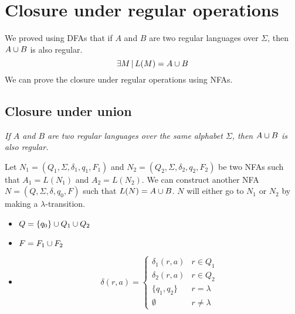 \documentclass{article}
\newcommand{\emptyString}{\lambda}
\begin{document}
\section{Closure under regular operations}

We proved using DFAs that if \(A\) and \(B\) are two regular languages over \(\Sigma\), then \(A\cup B\)
is also regular.
\[
    \exists M \,|\, L(M) = A \cup B
\]
We can prove the closure under regular operations using NFAs.

\subsection{Closure under union}

\textit{If \(A\) and \(B\) are two regular languages over the same alphabet
\(\Sigma\), then \(A \cup B\) is also regular.}

Let \(N_1 = (Q_1, \Sigma, \delta_1, q_1, F_1)\) and
\(N_2 = (Q_2, \Sigma, \delta_2, q_2, F_2)\) be two NFAs such that
\(A_1 = L(N_1)\) and \(A_2 = L(N_2)\).
We can construct another NFA \(N=(Q, \Sigma, \delta, q_0, F)\)
such that \(L(N)=A\cup B\).
\(N\) will either go to \(N_1\) or \(N_2\) by making a \(\emptyString\)-transition.
\begin{itemize}
    \item \(Q=\{q_0\} \cup Q_1 \cup Q_2\)
    \item \(F=F_1 \cup F_2\)
    \item \[
        \delta(r, a) =
        \begin{cases}
            \delta_1(r, a) & r \in Q_1 \\
            \delta_2(r, a) & r \in Q_2 \\
            \{q_1, q_2\} & r = \emptyString \\
            \emptyset & r \neq \emptyString
        \end{cases}
    \]
\end{itemize}

\begin{center}
\end{center}
\end{document}
